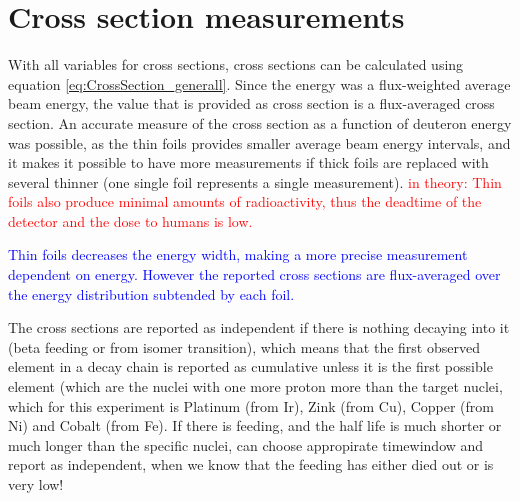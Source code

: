 \documentclass[a4paper,11pt,twoside]{book}
\begin{document}
\section{Cross section measurements} 
With all variables for cross sections, cross sections can be calculated using equation \ref{eq:CrossSection_generall}. Since the energy was a flux-weighted average beam energy, the value that is provided as cross section is a flux-averaged cross section. An accurate measure of the cross section as a function of deuteron energy was possible, as the thin foils provides smaller average beam energy intervals, and it makes it possible to have more measurements if thick foils are replaced with several thinner (one single foil represents a single measurement). \textcolor{red}{in theory: Thin foils also produce minimal amounts of radioactivity, thus the deadtime of the detector and the dose to humans is low.}%
%


\textcolor{blue}{Thin foils decreases the energy width, making a more precise measurement dependent on energy. However the reported cross sections are flux-averaged over the energy distribution subtended by each foil. } 

The cross sections are reported as independent if there is nothing decaying into it (beta feeding or from isomer transition), which means that the first observed element in a decay chain is reported as cumulative unless it is the first possible element (which are the nuclei with one more proton more than the target nuclei, which for this experiment is Platinum (from Ir), Zink (from Cu), Copper (from Ni) and Cobalt (from Fe). If there is feeding, and the half life is much shorter or much longer than the specific nuclei, can choose appropirate timewindow and report as independent, when we know that the feeding has either died out or is very low! 
\end{document}
